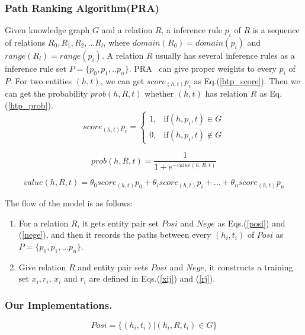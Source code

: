 \documentclass[runningheads]{llncs}
\begin{document}
\subsubsection{Path Ranking Algorithm(PRA)}
Given knowledge graph $G$ and a relation $R$, a inference rule $p_i$ of $R$ is a sequence of relations $R_0,R_1,R_2,...R_l$, where $domain(R_0) = domain(p_i)$ and $range(R_l)=range(p_i)$. A relation $R$ usually has several inference rules as a inference rule set $P=\{ p_0,p_1,..p_n\}$.
PRA~\cite{lao2011random,lao2010fast} can give proper weights to every $p_i$ of $P$. For two entities $(h,t)$, we can get $score_{(h,t)}p_i$ as Eq.(\ref{htp_score}). Then we can get the probability $prob(h,R,t)$ whether $(h,t)$ has relation $R$ as Eq.(\ref{htp_prob}).
\begin{equation}
  \label{htp_score}
score_{(h,t)}p_i = \left\{
	             \begin{array}{ll}
	             1, & \text{if} (h,p_i,t) \in G \\
	             0, & \text{if} (h,p_i,t) \notin G
	             \end{array}
	\right.
\end{equation}

\begin{equation}
  \label{htp_prob}
prob(h,R,t) = \frac{1}{1+e^{-value(h,R,t)}}
\end{equation}

\begin{equation}
  \label{htp_prob}
value(h,R,t) = \theta_{0}score_{(h,t)}p_0 + \theta_{i}score_{(h,t)}p_i +...+\theta_{n}score_{(h,t)}p_n
\end{equation}

The flow of the model is as follows:
\begin{enumerate}
  \item For a relation $R$, it gets entity pair set $Posi$ and $Nege$ as Eqs.(\ref{posi}) and (\ref{nege}), and then it records the paths between every $(h_i,t_i)$ of $Posi$ as $P = \{ p_0,p_1,...p_n\}$.
  \item Give relation $R$ and entity pair sets $Posi$ and $Nege$, it constructs a training set ${x_i,r_i}$, $x_i$ and $r_i$ are defined in Eqs.(\ref{xij}) and (\ref{rj}).
\end{enumerate}
\subsubsection{Our Implementations.}

\begin{equation}\label{posi}
    Posi = \{(h_i,t_i)|(h_i,R,t_i) \in G\}
\end{equation}
\end{document}
